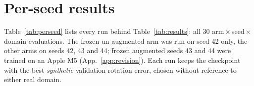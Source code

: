 \appendix

\section{Per-seed results}
\label{app:perseed}

Table~\ref{tab:perseed} lists every run behind Table~\ref{tab:results}: all 30
arm\,$\times$\,seed\,$\times$\,domain evaluations. The frozen un-augmented arm was run on
seed 42 only, the other arms on seeds 42, 43 and 44; frozen augmented seeds 43 and 44
were trained on an Apple M5 (App.~\ref{app:revision}). Each run keeps the checkpoint with the best
\emph{synthetic} validation rotation error, chosen without reference to either real
domain.

